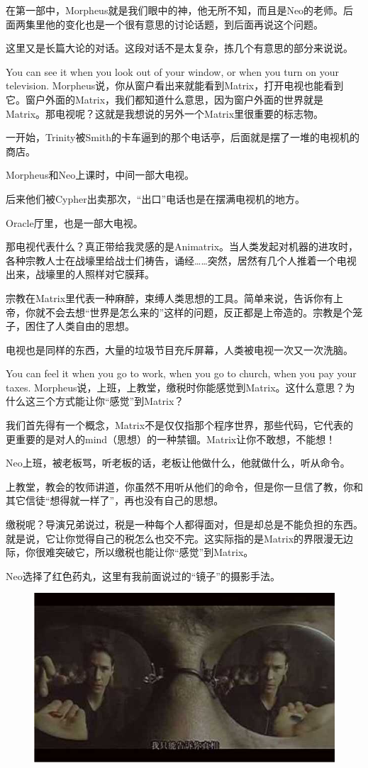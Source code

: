\documentclass{ctexart}
\begin{document}
在第一部中，Morpheus就是我们眼中的神，他无所不知，而且是Neo的老师。后面两集里他的变化也是一个很有意思的讨论话题，到后面再说这个问题。

这里又是长篇大论的对话。这段对话不是太复杂，拣几个有意思的部分来说说。

You can see it when you look out of your window, or when you turn on your television. Morpheus说，你从窗户看出来就能看到Matrix，打开电视也能看到它。窗户外面的Matrix，我们都知道什么意思，因为窗户外面的世界就是Matrix。那电视呢？这就是我想说的另外一个Matrix里很重要的标志物。

一开始，Trinity被Smith的卡车逼到的那个电话亭，后面就是摆了一堆的电视机的商店。

Morpheus和Neo上课时，中间一部大电视。

后来他们被Cypher出卖那次，“出口”电话也是在摆满电视机的地方。

Oracle厅里，也是一部大电视。

那电视代表什么？真正带给我灵感的是Animatrix。当人类发起对机器的进攻时，各种宗教人士在战壕里给战士们祷告，诵经……突然，居然有几个人推着一个电视出来，战壕里的人照样对它膜拜。

宗教在Matrix里代表一种麻醉，束缚人类思想的工具。简单来说，告诉你有上帝，你就不会去想“世界是怎么来的”这样的问题，反正都是上帝造的。宗教是个笼子，困住了人类自由的思想。

电视也是同样的东西，大量的垃圾节目充斥屏幕，人类被电视一次又一次洗脑。

You can feel it when you go to work, when you go to church, when you pay your taxes. Morpheus说，上班，上教堂，缴税时你能感觉到Matrix。这什么意思？为什么这三个方式能让你“感觉”到Matrix？

我们首先得有一个概念，Matrix不是仅仅指那个程序世界，那些代码，它代表的更重要的是对人的mind（思想）的一种禁锢。Matrix让你不敢想，不能想！

Neo上班，被老板骂，听老板的话，老板让他做什么，他就做什么，听从命令。

上教堂，教会的牧师讲道，你虽然不用听从他们的命令，但是你一旦信了教，你和其它信徒“想得就一样了”，再也没有自己的思想。

缴税呢？导演兄弟说过，税是一种每个人都得面对，但是却总是不能负担的东西。就是说，它让你觉得自己的税怎么也交不完。这实际指的是Matrix的界限漫无边际，你很难突破它，所以缴税也能让你“感觉”到Matrix。

Neo选择了红色药丸，这里有我前面说过的“镜子”的摄影手法。

\begin{figure}[htb]
\centering
\includegraphics[width=0.5\linewidth]{fig/read_Matrix-19}
\end{figure}
\end{document}
